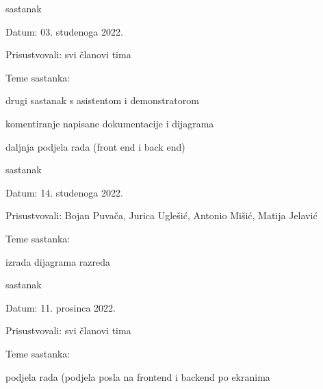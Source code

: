 \begin{packed_enum}
                \item  sastanak
			\item[] \begin{packed_item}
				\item Datum: 03. studenoga 2022.
				\item Prisustvovali: svi članovi tima
				\item Teme sastanka:
				\begin{packed_item}
					\item  drugi sastanak s asistentom i demonstratorom
					\item  komentiranje napisane dokumentacije i dijagrama
                        \item  daljnja podjela rada (front end i back end)
				\end{packed_item}
			\end{packed_item}

                \item  sastanak
			\item[] \begin{packed_item}
				\item Datum: 14. studenoga 2022.
				\item Prisustvovali: Bojan Puvača, Jurica Uglešić, Antonio Mišić, Matija Jelavić
				\item Teme sastanka:
				\begin{packed_item}
					\item  izrada dijagrama razreda
                        
				\end{packed_item}
			\end{packed_item}
   
                \item  sastanak
			\item[] \begin{packed_item}
				\item Datum: 11. prosinca 2022.
				\item Prisustvovali: svi članovi tima
				\item Teme sastanka:
				\begin{packed_item}
					\item  podjela rada (podjela posla na frontend i backend po ekranima
                        
				\end{packed_item}
			\end{packed_item}
   

\end{packed_enum}
